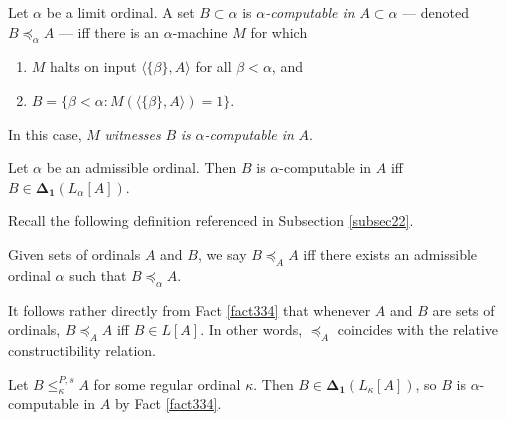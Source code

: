 \documentclass[12pt]{article}
\numberwithin{equation}{section}
\begin{document}
\begin{defi}
Let $\alpha$ be a limit ordinal. A set $B \subset \alpha$ is $\alpha$\emph{-computable in} $A \subset \alpha$ --- denoted $B \preceq_{\alpha} A$ --- iff there is an $\alpha$-machine $M$ for which
\begin{enumerate}[label=(\alph*)]
    \item $M$ halts on input $\langle \{\beta\}, A \rangle$ for all $\beta < \alpha$, and
    \item $B = \{\beta < \alpha : M(\langle \{\beta\}, A \rangle) = 1\}$.
\end{enumerate}
In this case, $M$ \emph{witnesses} $B$ \emph{is} $\alpha$\emph{-computable in} $A$.
\end{defi}

\begin{fact}\label{fact334}
Let $\alpha$ be an admissible ordinal. Then $B$ is $\alpha$-computable in $A$ iff $B \in \mathbf{\Delta_1}(L_{\alpha}[A])$.
\end{fact}

Recall the following definition referenced in Subsection \ref{subsec22}.

\begin{defi}
Given sets of ordinals $A$ and $B$, we say $B \preceq_A A$ iff there exists an admissible ordinal $\alpha$ such that $B \preceq_{\alpha} A$.
\end{defi}

\begin{rem}\label{rem336}
It follows rather directly from Fact \ref{fact334} that whenever $A$ and $B$ are sets of ordinals, $B \preceq_A A$ iff $B \in L[A]$. In other words, $\preceq_A$ coincides with the relative constructibility relation.
\end{rem}

\begin{lem}\label{lem269}
Let $B \leq^{P, s}_{\kappa} A$ for some regular ordinal $\kappa$. Then $B \in \mathbf{\Delta_1}(L_{\kappa}[A])$, so $B$ is $\alpha$-computable in $A$ by Fact \ref{fact334}.
\end{lem}
\end{document}
